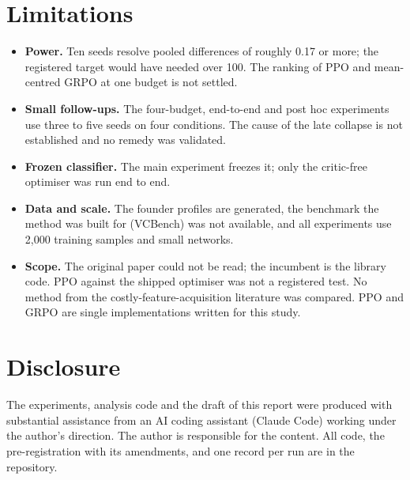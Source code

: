 \documentclass[11pt,a4paper]{article}
\begin{document}
\section{Limitations}

\begin{itemize}\setlength{\itemsep}{0pt}
\item \textbf{Power.} Ten seeds resolve pooled differences of roughly 0.17 or more; the registered target would
      have needed over 100. The ranking of PPO and mean-centred GRPO at one budget is not settled.
\item \textbf{Small follow-ups.} The four-budget, end-to-end and post hoc experiments use three to five seeds on
      four conditions. The cause of the late collapse is not established and no remedy was validated.
\item \textbf{Frozen classifier.} The main experiment freezes it; only the critic-free optimiser was run end to
      end.
\item \textbf{Data and scale.} The founder profiles are generated, the benchmark the method was built for
      (VCBench) was not available, and all experiments use 2{,}000 training samples and small networks.
\item \textbf{Scope.} The original paper could not be read; the incumbent is the library code. PPO against the
      shipped optimiser was not a registered test. No method from the costly-feature-acquisition literature was
      compared. PPO and GRPO are single implementations written for this study.
\end{itemize}

\section*{Disclosure}

The experiments, analysis code and the draft of this report were produced with substantial assistance from an AI
coding assistant (Claude Code) working under the author's direction. The author is responsible for the content.
All code, the pre-registration with its amendments, and one record per run are in the repository.



\end{document}
